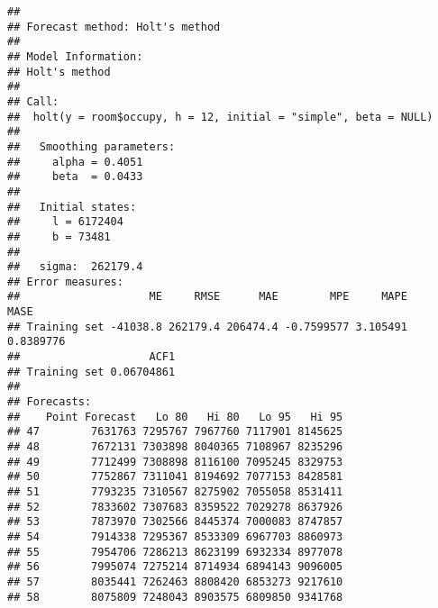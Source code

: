 \documentclass[]{article}
\newenvironment{Shaded}{\begin{snugshade}}{\end{snugshade}}
\newcommand{\CommentTok}[1]{\textcolor[rgb]{0.56,0.35,0.01}{\textit{#1}}}
\newcommand{\DataTypeTok}[1]{\textcolor[rgb]{0.13,0.29,0.53}{#1}}
\newcommand{\DecValTok}[1]{\textcolor[rgb]{0.00,0.00,0.81}{#1}}
\newcommand{\KeywordTok}[1]{\textcolor[rgb]{0.13,0.29,0.53}{\textbf{#1}}}
\newcommand{\NormalTok}[1]{#1}
\newcommand{\OperatorTok}[1]{\textcolor[rgb]{0.81,0.36,0.00}{\textbf{#1}}}
\newcommand{\StringTok}[1]{\textcolor[rgb]{0.31,0.60,0.02}{#1}}
\begin{document}
\begin{verbatim}
## 
## Forecast method: Holt's method
## 
## Model Information:
## Holt's method 
## 
## Call:
##  holt(y = room$occupy, h = 12, initial = "simple", beta = NULL) 
## 
##   Smoothing parameters:
##     alpha = 0.4051 
##     beta  = 0.0433 
## 
##   Initial states:
##     l = 6172404 
##     b = 73481 
## 
##   sigma:  262179.4
## Error measures:
##                    ME     RMSE      MAE        MPE     MAPE      MASE
## Training set -41038.8 262179.4 206474.4 -0.7599577 3.105491 0.8389776
##                    ACF1
## Training set 0.06704861
## 
## Forecasts:
##    Point Forecast   Lo 80   Hi 80   Lo 95   Hi 95
## 47        7631763 7295767 7967760 7117901 8145625
## 48        7672131 7303898 8040365 7108967 8235296
## 49        7712499 7308898 8116100 7095245 8329753
## 50        7752867 7311041 8194692 7077153 8428581
## 51        7793235 7310567 8275902 7055058 8531411
## 52        7833602 7307683 8359522 7029278 8637926
## 53        7873970 7302566 8445374 7000083 8747857
## 54        7914338 7295367 8533309 6967703 8860973
## 55        7954706 7286213 8623199 6932334 8977078
## 56        7995074 7275214 8714934 6894143 9096005
## 57        8035441 7262463 8808420 6853273 9217610
## 58        8075809 7248043 8903575 6809850 9341768
\end{verbatim}

\begin{Shaded}
\end{Shaded}
\end{document}
